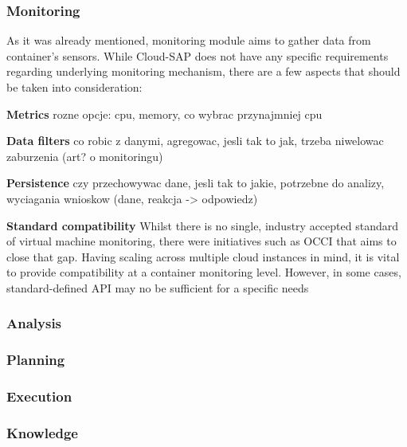 \subsubsection{Monitoring}
As it was already mentioned, monitoring module aims to gather data from container's sensors. While Cloud-SAP does not have any specific requirements regarding underlying monitoring mechanism, there are a few aspects that should be taken into consideration:
\begin{asparaenum}
  \item[\textbf{Metrics}] rozne opcje: cpu, memory, co wybrac przynajmniej cpu

  \item[\textbf{Data filters}] co robic z danymi, agregowac, jesli tak to jak, trzeba niwelowac zaburzenia (art? o monitoringu)

  \item[\textbf{Persistence}] czy przechowywac dane, jesli tak to jakie, potrzebne do analizy, wyciagania wnioskow (dane, reakcja -> odpowiedz)

  \item[\textbf{Standard compatibility}] Whilst there is no single, industry accepted standard of virtual machine monitoring, there were initiatives such as OCCI \cite{OCCI} that aims to close that gap. Having scaling across multiple cloud instances in mind, it is vital to provide compatibility at a container monitoring level. However, in some cases, standard-defined API may no be sufficient for a specific needs  
\end{asparaenum}


\subsubsection{Analysis}

\subsubsection{Planning}

\subsubsection{Execution}

\subsubsection{Knowledge}

